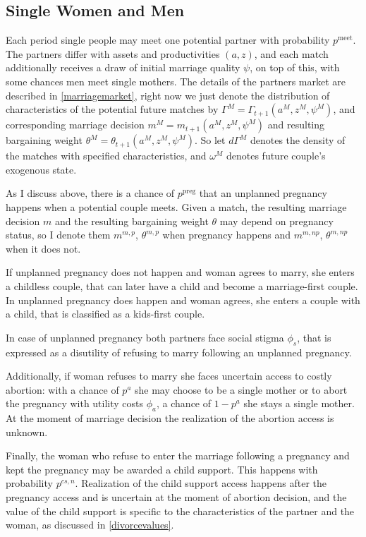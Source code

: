 \documentclass[12pt,letter]{article}
\begin{document}
\subsection{Single Women and Men\label{singles-main}}

Each period single people may meet one potential partner with probability $p^{\text{meet}}$. The partners differ with assets and productivities $(a,z)$, and each match additionally receives a draw of initial marriage quality $\psi$, on top of this, with some chances men meet single mothers. The details of the partners market are described in \ref{marriagemarket}, right now we just denote the distribution of characteristics of the potential future matches by $\Gamma^M = \Gamma_{t+1}(a^M,z^M,\psi^M)$, and corresponding marriage decision $m^M = m_{t+1}(a^M,z^M,\psi^M)$ and resulting bargaining weight $\theta^M = \theta_{t+1}(a^M,z^M,\psi^M)$. So let $d\Gamma^M$ denotes the density of the matches with specified characteristics, and $\omega^M$ denotes future couple's exogenous state.

As I discuss above, there is a chance of $p^{\text{preg}}$ that an unplanned pregnancy happens when a potential couple meets. Given a match, the resulting marriage decision $m$ and the resulting bargaining weight $\theta$ may depend on pregnancy status, so I denote them $m^{m,p}$, $\theta^{m,p}$ when pregnancy happens and $m^{m,np}$, $\theta^{m,np}$ when it does not.

If unplanned pregnancy does not happen and woman agrees to marry, she enters a childless couple, that can later have a child and become a marriage-first couple. In unplanned pregnancy does happen and woman agrees, she enters a couple with a child, that is classified as a kids-first couple. 

In case of unplanned pregnancy both partners face social stigma $\phi_s$, that is expressed as a disutility of refusing to marry following an unplanned pregnancy.

Additionally, if woman refuses to marry she faces uncertain access to costly abortion: with a chance of $p^a$ she may choose to be a single mother or to abort the pregnancy with utility costs $\phi_a$, a chance of $1-p^a$ she stays a single mother. At the moment of marriage decision the realization of the abortion access is unknown.

Finally, the woman who refuse to enter the marriage following a pregnancy and kept the pregnancy may be awarded a child support. This happens with probability $p^{cs,n}$. Realization of the child support access happens after the pregnancy access and is uncertain at the moment of abortion decision, and the value of the child support is specific to the characteristics of the partner and the woman, as discussed in \ref{divorcevalues}. 
\end{document}
